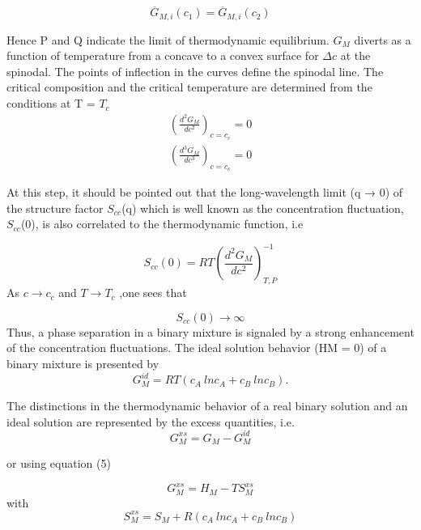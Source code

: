 \documentclass[12pt]{article}
\newcommand*{\1}{\hspace{1pt}}
\begin{document}
    \begin{equation}
        \overline{G} _{M,i}(c _{1}) =  \overline{G} _{M,i}(c _{2})          \tag*{( i= A,B )}
    \end{equation}

    Hence P and Q indicate the limit of thermodynamic equilibrium. $G _M$ diverts as a function of
temperature from a concave to a convex surface for $\Delta c $ at the spinodal. The points of
inflection in the curves define the spinodal line. The critical composition and the critical
temperature are determined from the conditions at T = $T _c$\\

    \begin{align}
        \left(\frac{d^2 {G _M}}{d c^2} \right) _{c = c_c} = 0 \\
        \left(\frac{d^3 {G _M}}{d c^3} \right) _{c = c_c} = 0 
    \end{align}


    At this step, it should be pointed out that the long-wavelength limit (q → 0) of
the structure factor $S _{cc} $(q) which is well known as the
concentration fluctuation, $S _{cc} $(0), is also correlated to the thermodynamic function, i.e

    \begin{equation}
        S_{cc}(0) =  RT \left(\frac{d^2 G _M}{d c^2} \right) ^ {-1}_ {T,P}
    \end{equation}
As $ c\to c _c$ and $ T\to T_c $ ,one sees that

    \begin{equation}
        S_{cc}(0) \to \infty
    \end{equation}  
Thus, a phase separation in a binary mixture is signaled by a strong enhancement of the
concentration fluctuations. 
The ideal solution behavior (HM = 0) of a binary mixture is presented by
    \begin{equation}
        G ^ {id} _M = RT (c_A \ ln c_A + c_B \ ln c_B).
    \end{equation}

The distinctions in the thermodynamic behavior of a real binary solution and an ideal solution 
are represented by the excess quantities, i.e.
    \begin{equation}
        G ^ {xs} _M = G _M - G ^{id} _M
    \end{equation}

or using equation (5)

    \begin{equation}
        G ^ {xs} _M = H _M - T S ^{xs} _M
    \end{equation}
with
    \begin{equation}
        S ^{xs} _M = S _M + R (c _A \ ln c_A + c _B \ ln c _B)
    \end{equation}\\
\end{document}
